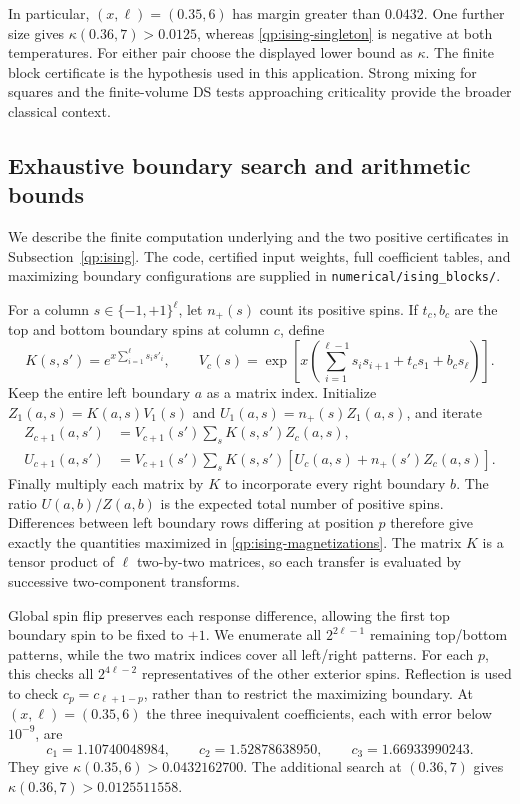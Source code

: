 In particular, $(x,\ell)=(0.35,6)$ has margin greater than $0.0432$.
One further size gives $\kappa(0.36,7)>0.0125$, whereas
\eqref{qp:ising-singleton} is negative at both temperatures.
For either pair choose the displayed lower bound as $\kappa$.
The finite block certificate is the hypothesis used in this
application. Strong mixing for squares \cite{MOS1994} and the
finite-volume DS tests approaching criticality \cite{Shlosman}
provide the broader classical context.

\subsection{Exhaustive boundary search and arithmetic bounds}
\label{app:ising-computation}

We describe the finite computation underlying 
and the two positive certificates in Subsection~\ref{qp:ising}.
The code, certified input weights, full coefficient tables, and
maximizing boundary configurations are supplied in
\texttt{numerical/ising\_blocks/}.

For a column $s\in\{-1,+1\}^{\ell}$, let $n_+(s)$ count its positive
spins. If $t_c,b_c$ are the top and bottom boundary spins at column
$c$, define
\[
 K(s,s')=e^{x\sum_{i=1}^{\ell}s_is'_i},\qquad
 V_c(s)=\exp\!\left[x\left(\sum_{i=1}^{\ell-1}s_is_{i+1}
                         +t_cs_1+b_cs_\ell\right)\right].
\]
Keep the entire left boundary $a$ as a matrix index. Initialize
$Z_1(a,s)=K(a,s)V_1(s)$ and $U_1(a,s)=n_+(s)Z_1(a,s)$, and iterate
\begin{align*}
 Z_{c+1}(a,s')&=V_{c+1}(s')\sum_sK(s,s')Z_c(a,s),\\
 U_{c+1}(a,s')&=V_{c+1}(s')\sum_sK(s,s')
                     [U_c(a,s)+n_+(s')Z_c(a,s)].
\end{align*}
Finally multiply each matrix by $K$ to incorporate every right
boundary $b$. The ratio $U(a,b)/Z(a,b)$ is the expected total number
of positive spins. Differences between left boundary rows differing
at position $p$ therefore give exactly the quantities maximized in
\eqref{qp:ising-magnetizations}. The matrix $K$ is a tensor product
of $\ell$ two-by-two matrices, so each transfer is evaluated by
successive two-component transforms.

Global spin flip preserves each response difference, allowing the
first top boundary spin to be fixed to $+1$. We enumerate all
$2^{2\ell-1}$ remaining top/bottom patterns, while the two matrix
indices cover all left/right patterns. For each $p$, this checks
all $2^{4\ell-2}$ representatives of the other exterior spins.
Reflection is used to check $c_p=c_{\ell+1-p}$, rather than to
restrict the maximizing boundary. At $(x,\ell)=(0.35,6)$ the three
inequivalent coefficients, each with error below $10^{-9}$, are
\[
 c_1=1.10740048984,\qquad c_2=1.52878638950,\qquad
 c_3=1.66933990243.
\]
They give $\kappa(0.35,6)>0.0432162700$.
The additional search at $(0.36,7)$ gives
$\kappa(0.36,7)>0.0125511558$.

